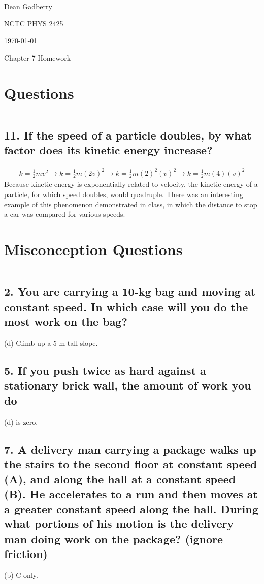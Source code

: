 \documentclass[12pt,a4paper,english]{article}
\begin{document}
\begin{flushright}
  Dean Gadberry

  NCTC PHYS 2425

  \today
\end{flushright}
\begin{center}
  {\large Chapter 7 Homework}
\end{center}
\begin{flushleft}

  \section*{Questions}
  \hrule
  \subsection{11. If the speed of a particle doubles, by what factor does its kinetic energy increase?}
  \begin{align*}
    k=\frac{1}{2}mv^2       \rightarrow
    k=\frac{1}{2}m(2v)^2    \rightarrow
    k=\frac{1}{2}m(2)^2(v)^2\rightarrow
    k=\frac{1}{2}m(4)(v)^2
  \end{align*}
  Because kinetic energy is exponentially related to velocity, the kinetic energy of a particle, for which speed doubles, would quadruple. There was an interesting example of this phenomenon demonstrated in class, in which the distance to stop a car was compared for various speeds.
  \section*{Misconception Questions}
  \hrule
  \subsection{2. You are carrying a 10-kg bag and moving at constant speed. In which case will you do the most work on the bag?}
  (d) Climb up a 5-m-tall slope.
  \subsection{5. If you push twice as hard against a stationary brick wall, the amount of work you do}
  (d) is zero.
  \subsection{7. A delivery man carrying a package walks up the stairs to the second floor at constant speed (A), and along the hall at a constant speed (B). He accelerates to a run and then moves at a greater constant speed along the hall. During what portions of his motion is the delivery man doing work on the package? (ignore friction)}
  (b) C only.

\end{flushleft}
\end{document}
